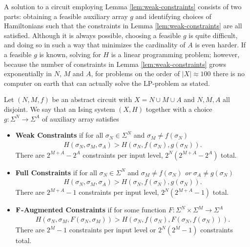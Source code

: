 \documentclass{article}
\begin{document}
A solution to a circuit employing Lemma \ref{lem:weak-constraints} consists of two parts: obtaining a feasible auxiliary array $g$ and identifying choices of Hamiltonians such that the constraints in Lemma \ref{lem:weak-constraints} are all satisfied. Although it is always possible, choosing a feasible $g$ is quite difficult, and doing so in such a way that minimizes the cardinality of $A$ is even harder. If a feasible $g$ is known, solving for $H$ is a linear programming problem; however, because the number of constraints in Lemma \ref{lem:weak-constraints} grows exponentially in $N$, $M$ and $A$, for problems on the order of $|X| \approx 100$ there is no computer on earth that can actually solve the LP-problem as stated.

\begin{defn}\label{defn:constraints}
  Let $(N,M,f)$ be an abstract circuit with $X = N \cup M \cup A$ and $N, M, A$ all disjoint. We say that an Ising system $(X, H)$ together with a choice $g: \Sigma^N\to \Sigma^A$ of auxiliary array satisfies
  \begin{itemize}
    \item \textbf{Weak Constraints} if for all $\sigma_N \in \Sigma^N$ and $\sigma_M \neq f(\sigma_N)$
      \begin{align*}
        H(\sigma_N, \sigma_M, \sigma_A) > H(\sigma_N, f(\sigma_N), g(\sigma_N)).
      \end{align*}
      There are $2^{M + A} - 2^A$ constraints per input level, $2^N(2^{M+A} - 2^A)$ total.
    \item \textbf{Full Constraints} if for all $\sigma_N \in \Sigma^N$ and $\sigma_M \neq f(\sigma_N)$ \emph{or} $\sigma_A \neq g(\sigma_N)$
      \begin{align*}
        H(\sigma_N, \sigma_M, \sigma_A) > H(\sigma_N, f(\sigma_N), g(\sigma_N)).
      \end{align*}
      There are $2^{M+A} - 1$ constraints per input level, $2^N(2^{M+A} - 1)$ total.
    \item \textbf{$\mathbf{F}$-Augmented Constraints} if for some function $F:\Sigma^{N} \times \Sigma^M \to \Sigma^A$
      \begin{align*}
        H(\sigma_N, \sigma_M, F(\sigma_N, \sigma_M)) > H(\sigma_N, f(\sigma_N), F(\sigma_N, f(\sigma_N))).
      \end{align*}
      There are $2^M - 1$ constraints per input level or $2^N(2^M - 1)$ constraints total.
  \end{itemize}
\end{defn}
\end{document}
